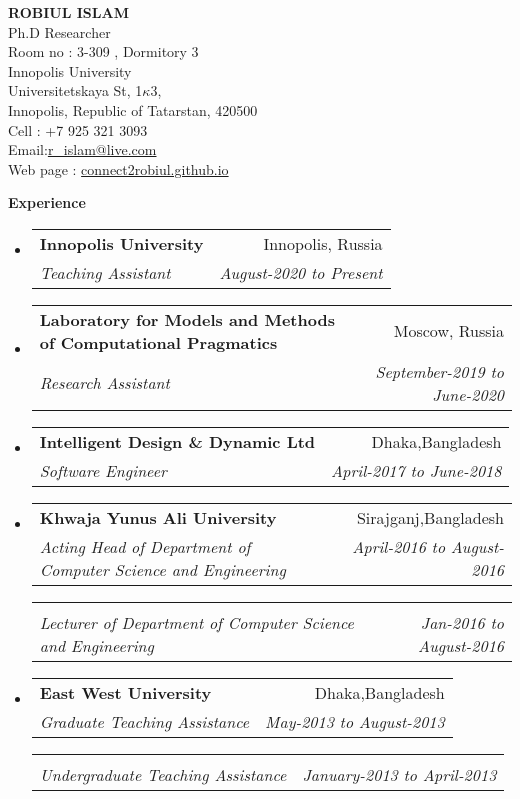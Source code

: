 \documentclass[letterpaper,10pt]{article}
\makeatletter
\newcommand{\resheading}[1]{{\large \colorbox{mygrey}{\begin{minipage}{\textwidth}{\textbf{#1 \vphantom{p\^{E}}}}\end{minipage}}}}
\newcommand{\ressubheading}[4]{
\begin{tabular*}{6.5in}{l@{\extracolsep{\fill}}r}
		\textbf{#1} & #2 \\
		\textit{#3} & \textit{#4} \\
\end{tabular*}\vspace{-6pt}}
\makeatother
\begin{document}
\textbf{ROBIUL ISLAM }  \\ 
Ph.D Researcher \\ 
Room no : 3-309 , Dormitory 3 \\ 
Innopolis University \\ 
Universitetskaya St, 1$\kappa$3, \\
Innopolis, Republic of Tatarstan, 420500 \\

Cell : +7 925 321 3093 \\
Email:\href{mailto:r\_islam@live.com}{r\_islam@live.com} \\
Web page : \url{connect2robiul.github.io}



\vspace{0.1in}


\vspace{0.1in}
\resheading{Experience}
\begin{itemize}

\item

\ressubheading{Innopolis University}{Innopolis, Russia}{Teaching Assistant}{August-2020 to Present}
\item

\ressubheading{Laboratory for Models and Methods of Computational Pragmatics}{Moscow, Russia}{Research Assistant}{September-2019 to June-2020}

\item

\ressubheading{Intelligent Design \& Dynamic Ltd}{Dhaka,Bangladesh}{Software Engineer}{April-2017 to June-2018}
\item
\ressubheading{Khwaja Yunus Ali University}{Sirajganj,Bangladesh}{Acting Head of Department of Computer Science and Engineering}{April-2016 to August-2016}
\ressubheading{ }{}{Lecturer of Department of Computer Science and Engineering}{Jan-2016 to August-2016 }

\item
	\ressubheading{East West University}{Dhaka,Bangladesh}{Graduate Teaching Assistance }{May-2013 to August-2013 }
\ressubheading{}{}{Undergraduate Teaching Assistance}{January-2013 to April-2013}	
\end{itemize}
\end{document}

